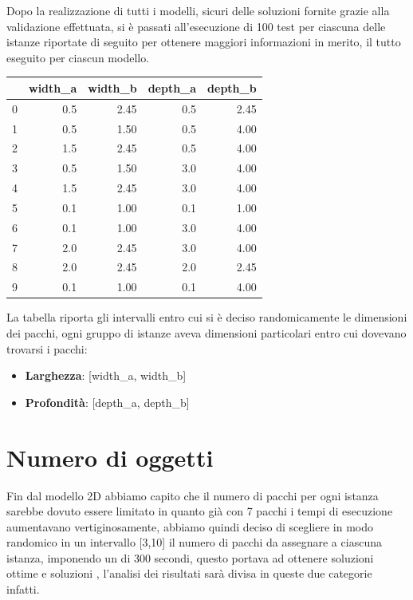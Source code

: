 Dopo la realizzazione di tutti i modelli, sicuri delle soluzioni fornite grazie alla validazione effettuata, si è passati all'esecuzione di 100 test per ciascuna delle istanze riportate di seguito per ottenere maggiori informazioni in merito, il tutto eseguito per ciascun modello.
\begin{center}
	\begin{tabular}{lrrrr}
		\toprule
		{} & width\_a & width\_b & depth\_a & depth\_b \\
		\midrule
		0  & 0.5      & 2.45     & 0.5      & 2.45     \\
		1  & 0.5      & 1.50     & 0.5      & 4.00     \\
		2  & 1.5      & 2.45     & 0.5      & 4.00     \\
		3  & 0.5      & 1.50     & 3.0      & 4.00     \\
		4  & 1.5      & 2.45     & 3.0      & 4.00     \\
		5  & 0.1      & 1.00     & 0.1      & 1.00     \\
		6  & 0.1      & 1.00     & 3.0      & 4.00     \\
		7  & 2.0      & 2.45     & 3.0      & 4.00     \\
		8  & 2.0      & 2.45     & 2.0      & 2.45     \\
		9  & 0.1      & 1.00     & 0.1      & 4.00     \\
		\bottomrule
	\end{tabular}
\end{center}

La tabella riporta gli intervalli entro cui si è deciso randomicamente le dimensioni dei pacchi, ogni gruppo di istanze aveva dimensioni particolari entro cui dovevano trovarsi i pacchi:
\begin{itemize}
	\item \textbf{Larghezza}: [width\_a, width\_b]
	\item \textbf{Profondità}: [depth\_a, depth\_b]
\end{itemize}

\section{Numero di oggetti}
Fin dal modello 2D abbiamo capito che il numero di pacchi per ogni istanza sarebbe dovuto essere limitato in quanto già con 7 pacchi i tempi di esecuzione aumentavano vertiginosamente, abbiamo quindi deciso di scegliere in modo randomico in un intervallo [3,10] il numero di pacchi da assegnare a ciascuna istanza, imponendo un  di 300 secondi, questo portava ad ottenere soluzioni ottime e soluzioni , l'analisi dei risultati sarà divisa in queste due categorie infatti.

